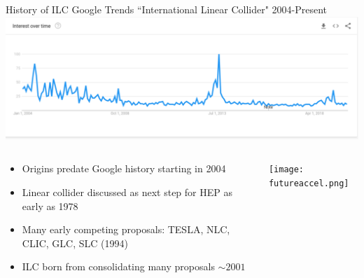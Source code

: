 \documentclass[10pt]{beamer}
\begin{document}
\begin{frame}{History of ILC}
Google Trends ``International Linear Collider" 2004-Present
\includegraphics[scale=0.25]{ilctrends.pdf}\\
\begin{columns}
\begin{column}{0.5\textwidth}
\begin{itemize}
\scriptsize
\item Origins predate Google history starting in 2004
\item Linear collider discussed as next step for HEP as early as 1978
\item Many early competing proposals: TESLA, NLC, CLIC, GLC, SLC (1994)
\item ILC born from consolidating many proposals $\sim 2001$
\end{itemize}
\end{column}
\begin{column}{0.5\textwidth}
\texttt{[image: futureaccel.png]}\\
\end{column}
\end{columns}
\end{frame}
\end{document}
